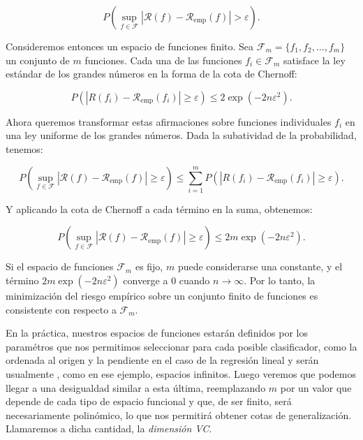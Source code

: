 \documentclass{report}
\begin{document}
\begin{equation}
P\left(\sup_{f \in \mathcal{F}} |\mathcal{R}(f) - \mathcal{R}_{\text{emp}}(f)| > \varepsilon \right). \label{eq:med_unif_riesgo_riesgo_emp}
\end{equation}

Consideremos entonces un espacio de funciones finito. Sea
\(\mathcal{F}_{m} = \{f_1, f_2, \dots, f_m\}\) un conjunto de \(m\) funciones. Cada una de las funciones
\(f_i \in \mathcal{F}_{m}\) satisface la ley estándar de los grandes números en la forma de la cota de Chernoff:

\[
P\left(|R(f_i) - \mathcal{R}_{\text{emp}}(f_i)| \geq \varepsilon \right) \leq 2 \exp(-2n\varepsilon^2).
\]

Ahora queremos transformar estas afirmaciones sobre funciones individuales \(f_i\) en una ley uniforme de los
grandes números. Dada la subatividad de la probabilidad, tenemos:

\[
P\left(\sup_{f \in \mathcal{F}} |\mathcal{R}(f) - \mathcal{R}_{\text{emp}}(f)| \geq \varepsilon \right) \leq \sum_{i=1}^m P\left(|R(f_i) - \mathcal{R}_{\text{emp}}(f_i)| \geq \varepsilon \right).
\]

Y aplicando la cota de Chernoff a cada término en la suma, obtenemos:

\begin{equation}
P\left(\sup_{f \in \mathcal{F}} |\mathcal{R}(f) - \mathcal{R}_{\text{emp}}(f)| \geq \varepsilon \right) \leq 2m \exp(-2n\varepsilon^2). \label{eq: chernoff acotada por m}
\end{equation}

Si el espacio de funciones \(\mathcal{F}_{m}\) es fijo, \(m\) puede considerarse una
constante, y el término \(2m \exp(-2n\varepsilon^2)\) converge a \(0\) cuando \(n \to \infty\). Por lo tanto,
la minimización del riesgo empírico sobre un conjunto finito de funciones es consistente con respecto
a \(\mathcal{F}_{m}\).

En la práctica, nuestros espacios de funciones estarán definidos por los paramétros que nos permitimos
seleccionar para cada posible clasificador, como la ordenada al origen y la pendiente en el caso de la regresión lineal y serán usualmente
, como en ese ejemplo,
espacios infinitos. Luego veremos que podemos llegar a una desigualdad similar a esta última, reemplazando $m$ por un valor que depende
de cada tipo de espacio funcional y que, de ser finito, será necesariamente polinómico, lo que nos permitirá obtener cotas de generalización.
Llamaremos a dicha cantidad, la \textit{dimensión VC}.
\end{document}
